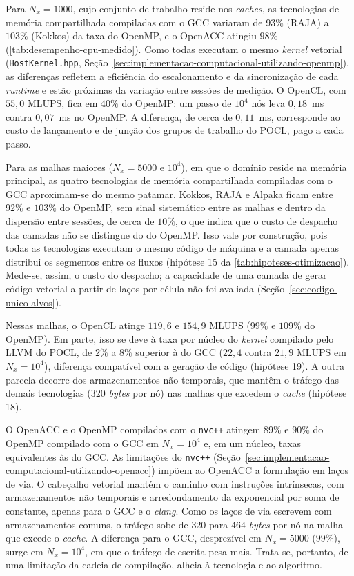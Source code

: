 Para \(N_x = 1000\), cujo conjunto de trabalho reside nos \textit{caches}, as tecnologias de memória compartilhada compiladas com o GCC variaram de \(93\%\) (RAJA) a \(103\%\) (Kokkos) da taxa do OpenMP, e o OpenACC atingiu \(98\%\) (\autoref{tab:desempenho-cpu-medido}).
Como todas executam o mesmo \textit{kernel} vetorial (\texttt{HostKernel.hpp}, Seção~\ref{sec:implementacao-computacional-utilizando-openmp}), as diferenças refletem a eficiência do escalonamento e da sincronização de cada \textit{runtime} e estão próximas da variação entre sessões de medição.
O OpenCL, com \(55{,}0\) MLUPS, fica em \(40\%\) do OpenMP: um passo de \(10^4\) nós leva \(0{,}18\)~ms contra \(0{,}07\)~ms no OpenMP.
A diferença, de cerca de \(0{,}11\)~ms, corresponde ao custo de lançamento e de junção dos grupos de trabalho do POCL, pago a cada passo.

Para as malhas maiores (\(N_x = 5000\) e \(10^4\)), em que o domínio reside na memória principal, as quatro tecnologias de memória compartilhada compiladas com o GCC aproximam-se do mesmo patamar.
Kokkos, RAJA e Alpaka ficam entre \(92\%\) e \(103\%\) do OpenMP, sem sinal sistemático entre as malhas e dentro da dispersão entre sessões, de cerca de \(10\%\), o que indica que o custo de despacho das camadas não se distingue do do OpenMP.
Isso vale por construção, pois todas as tecnologias executam o mesmo código de máquina e a camada apenas distribui os segmentos entre os fluxos (hipótese 15 da \autoref{tab:hipoteses-otimizacao}).
Mede-se, assim, o custo do despacho; a capacidade de uma camada de gerar código vetorial a partir de laços por célula não foi avaliada (Seção~\ref{sec:codigo-unico-alvos}).

Nessas malhas, o OpenCL atinge \(119{,}6\) e \(154{,}9\) MLUPS (\(99\%\) e \(109\%\) do OpenMP).
Em parte, isso se deve à taxa por núcleo do \textit{kernel} compilado pelo LLVM do POCL, de \(2\%\) a \(8\%\) superior à do GCC (\(22{,}4\) contra \(21{,}9\) MLUPS em \(N_x = 10^4\)), diferença compatível com a geração de código (hipótese 19).
A outra parcela decorre dos armazenamentos não temporais, que mantêm o tráfego das demais tecnologias (\(320\) \textit{bytes} por nó) nas malhas que excedem o \textit{cache} (hipótese 18).

O OpenACC e o OpenMP compilados com o \texttt{nvc++} atingem \(89\%\) e \(90\%\) do OpenMP compilado com o GCC em \(N_x = 10^4\) e, em um núcleo, taxas equivalentes às do GCC.
As limitações do \texttt{nvc++} (Seção~\ref{sec:implementacao-computacional-utilizando-openacc}) impõem ao OpenACC a formulação em laços de via.
O cabeçalho vetorial mantém o caminho com instruções intrínsecas, com armazenamentos não temporais e arredondamento da exponencial por soma de constante, apenas para o GCC e o \textit{clang}.
Como os laços de via escrevem com armazenamentos comuns, o tráfego sobe de \(320\) para \(464\) \textit{bytes} por nó na malha que excede o \textit{cache}.
A diferença para o GCC, desprezível em \(N_x = 5000\) (\(99\%\)), surge em \(N_x = 10^4\), em que o tráfego de escrita pesa mais.
Trata-se, portanto, de uma limitação da cadeia de compilação, alheia à tecnologia e ao algoritmo.

